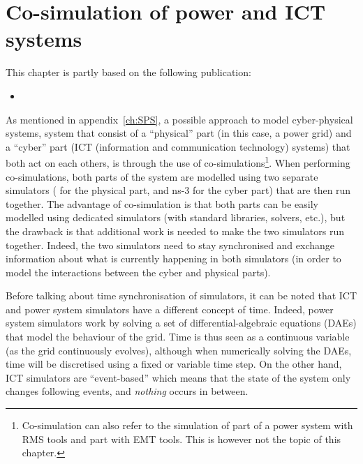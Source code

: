 \chapter{Co-simulation of power and ICT systems}
\label{ch:cosim}
\minitoc

\begin{tcolorbox}[width=\linewidth, sharp corners=all,
    colback=white!80!black,
    colframe=white!80!black]
This chapter is partly based on the following publication:
\begin{itemize}
    \item {}
\end{itemize}
\end{tcolorbox}

As mentioned in appendix~\ref{ch:SPS}, a possible approach to model cyber-physical systems, \ie system that consist of a ``physical'' part (in this case, a power grid) and a ``cyber'' part (\ie ICT (information and communication technology) systems) that both act on each others, is through the use of co-simulations\footnote{Co-simulation can also refer to the simulation of part of a power system with RMS tools and part with EMT tools. This is however not the topic of this chapter.}. When performing co-simulations, both parts of the system are modelled using two separate simulators (\eg \Dynawo{} for the physical part, and ns-3 for the cyber part) that are then run together. The advantage of co-simulation is that both parts can be easily modelled using dedicated simulators (with standard libraries, solvers, etc.), but the drawback is that additional work is needed to make the two simulators run together. Indeed, the two simulators need to stay synchronised and exchange information about what is currently happening in both simulators (in order to model the interactions between the cyber and physical parts).

Before talking about time synchronisation of simulators, it can be noted that ICT and power system simulators have a different concept of time. Indeed, power system simulators work by solving a set of differential-algebraic equations (DAEs) that model the behaviour of the grid. Time is thus seen as a continuous variable (as the grid continuously evolves), although when numerically solving the DAEs, time will be discretised using a fixed or variable time step. On the other hand, ICT simulators are ``event-based'' which means that the state of the system only changes following events, and \emph{nothing} occurs in between.

